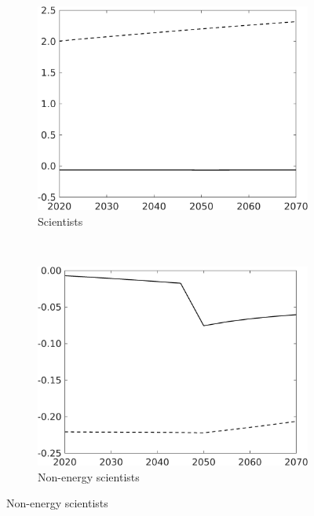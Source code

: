 \begin{figure}[h!!!]
\vspace{3mm}
	\begin{subfigure}[]{0.4\textwidth}
		\caption{Scientists}
		\includegraphics[width=1\textwidth]{../../codding_model/own_basedOnFried/optimalPol_010922_revision/figures/all_13Sept22_Tplus30/S_PercentageLFDyn_Target_regime4_knspil0_spillover0_noskill0_sep0_xgrowth0_PV1_etaa0.79_lgd0.png}
	\end{subfigure}
\begin{minipage}[]{0.1\textwidth}
\ 
\end{minipage}
\begin{subfigure}[]{0.4\textwidth}
\caption{Non-energy scientists}
\includegraphics[width=1\textwidth]{../../codding_model/own_basedOnFried/optimalPol_010922_revision/figures/all_13Sept22_Tplus30/snS_PercentageLFDyn_Target_regime4_knspil0_spillover0_noskill0_sep0_xgrowth0_PV1_etaa0.79_lgd0.png}

\end{subfigure}
\end{figure}
